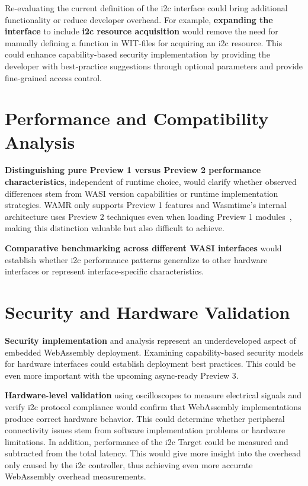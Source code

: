 Re-evaluating the current definition of the \acrshort{i2c} interface could bring additional functionality or reduce developer overhead. For example, \textbf{expanding the interface} to include \textbf{\acrshort{i2c} resource acquisition} would remove the need for manually defining a function in WIT-files for acquiring an \acrshort{i2c} resource. This could enhance capability-based security implementation by providing the developer with best-practice suggestions through optional parameters and provide fine-grained access control.

\section*{Performance and Compatibility Analysis}
\label{sec:performance-compatibility}

\textbf{Distinguishing pure Preview 1 versus Preview 2 performance characteristics}, independent of runtime choice, would clarify whether observed differences stem from WASI version capabilities or runtime implementation strategies. WAMR only supports Preview 1 features and Wasmtime's internal architecture uses Preview 2 techniques even when loading Preview 1 modules~\cite{wasmtime_and_cranelift_2023, wasmtime_p1_crate_docs, wasmtime_p2_crate_docs}, making this distinction valuable but also difficult to achieve.

\textbf{Comparative benchmarking across different WASI interfaces} would establish whether \acrshort{i2c} performance patterns generalize to other hardware interfaces or represent interface-specific characteristics.

\section*{Security and Hardware Validation}
\label{sec:security-hardware}

\textbf{Security implementation} and analysis represent an underdeveloped aspect of embedded WebAssembly deployment. Examining capability-based security models for hardware interfaces could establish deployment best practices. This could be even more important with the upcoming async-ready Preview 3.

\textbf{Hardware-level validation} using oscilloscopes to measure electrical signals and verify \acrshort{i2c} protocol compliance would confirm that WebAssembly implementations produce correct hardware behavior. This could determine whether peripheral connectivity issues stem from software implementation problems or hardware limitations. In addition, performance of the \acrshort{i2c} Target could be measured and subtracted from the total latency. This would give more insight into the overhead only caused by the \acrshort{i2c} controller, thus achieving even more accurate WebAssembly overhead measurements.

